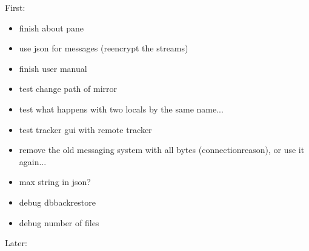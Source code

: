\documentclass{article}
\begin{document}
First:
\begin{itemize}
\item finish about pane
\item use json for messages (reencrypt the streams)
\item finish user manual
\item test change path of mirror
\item test what happens with two locals by the same name...
\item test tracker gui with remote tracker
\item remove the old messaging system with all bytes (connectionreason), or use it again...
\item max string in json?
\item debug dbbackrestore
\item debug number of files
\end{itemize}
Later:
\end{document}
